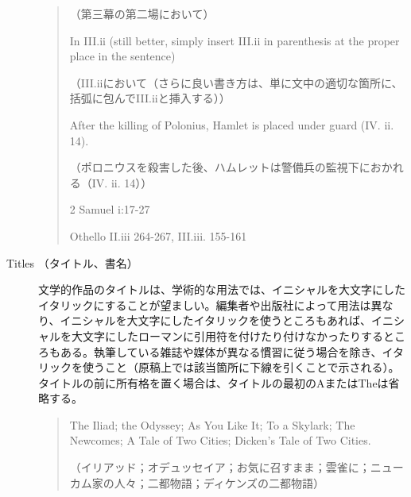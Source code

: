 \begin{description}
\begin{quote}
    （第三幕の第二場において）
    
    In III.ii (still better, simply insert III.ii in parenthesis at
the proper place in the sentence)


（III.iiにおいて（さらに良い書き方は、単に文中の適切な箇所に、括弧に包んでIII.iiと挿入する））

After the killing of Polonius, Hamlet is placed under guard (IV.
ii. 14).

（ポロニウスを殺害した後、ハムレットは警備兵の監視下におかれる（IV.
ii. 14））

2 Samuel i:17-27

Othello II.iii 264-267, III.iii. 155-161
\end{quote}
\item [Titles （タイトル、書名）]
文学的作品のタイトルは、学術的な用法では、イニシャルを大文字にしたイタリックにすることが望ましい。編集者や出版社によって用法は異なり、イニシャルを大文字にしたイタリックを使うところもあれば、イニシャルを大文字にしたローマンに引用符を付けたり付けなかったりするところもある。執筆している雑誌や媒体が異なる慣習に従う場合を除き、イタリックを使うこと（原稿上では該当箇所に下線を引くことで示される）。タイトルの前に所有格を置く場合は、タイトルの最初のAまたはTheは省略する。
\begin{quote}
    The Iliad; the Odyssey; As You Like It; To a Skylark; The
Newcomes; A Tale of Two Cities; Dicken's Tale of Two Cities.

（イリアッド；オデュッセイア；お気に召すまま；雲雀に；ニューカム家の人々；二都物語；ディケンズの二都物語）
\end{quote}
\end{description}